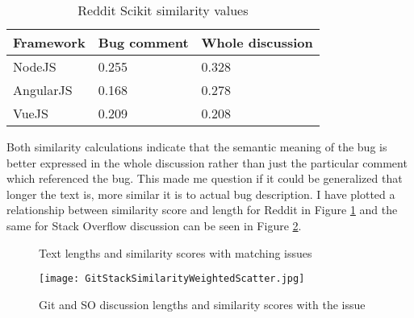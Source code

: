\begin{table}[H]
\centering
\begin{tabular}{ |p{3cm}||p{3cm}|p{4cm}|}
 \hline
\textbf{ Framework }& \textbf{Bug comment}& \textbf{Whole discussion}\\
 \hline
 NodeJS   & 0.255 & 0.328\\ \hline 
 AngularJS & 0.168 & 0.278 \\ \hline 
 VueJS &  0.209  & 0.208\\ \hline
\end{tabular}
\caption{Reddit Scikit similarity values}
\label{table:RedditSCIKITsimilarity}
\end{table}

Both similarity calculations indicate that the semantic meaning of the bug is better expressed in the whole discussion rather than just the particular comment which referenced the bug. This made me question if it could be generalized that longer the text is, more similar it is to actual bug description. I have plotted a relationship between similarity score and length for Reddit in Figure \ref{fig:SimilarityLengthRelationshipComment} and the same for Stack Overflow discussion can be seen in Figure \ref{fig:GitStackSimilarityWeightedScatter}.

\begin{figure}[H]%
    \centering
    \qquad
    \caption{Text lengths and similarity scores with matching issues}%
    \label{fig:SimilarityLengthRelationshipComment}%
\end{figure}

\begin{figure}[H]%
    \centering
	\texttt{[image: GitStackSimilarityWeightedScatter.jpg]}
    \caption{Git and SO discussion lengths and similarity scores with the issue}%
    \label{fig:GitStackSimilarityWeightedScatter}%
\end{figure}
